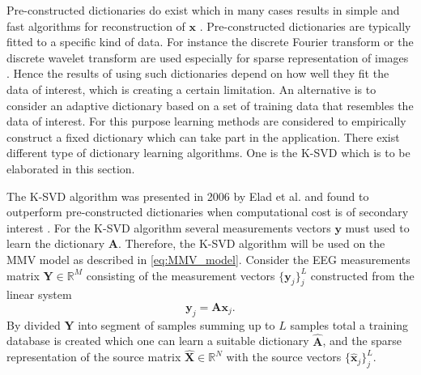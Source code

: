 Pre-constructed dictionaries do exist which in many cases results in simple and fast algorithms for reconstruction of $\mathbf{x}$ \cite{Elad_book}. 
Pre-constructed dictionaries are typically fitted to a specific kind of data. 
For instance the discrete Fourier transform or the discrete wavelet transform are used especially for sparse representation of images \cite{Elad_book}. 
Hence the results of using such dictionaries depend on how well they fit the data of interest, which is creating a certain limitation. 
An alternative is to consider an adaptive dictionary based on a set of training data that resembles the data of interest. 
For this purpose learning methods are considered to empirically construct a fixed dictionary which can take part in the application. 
There exist different type of dictionary learning algorithms. One is the K-SVD which is to be elaborated in this section. 

The K-SVD algorithm was presented in 2006 by Elad et al. and found to outperform pre-constructed dictionaries when computational cost is of secondary interest \cite{Elad2006}. 
For the K-SVD algorithm several measurements vectors $\mathbf{y}$ must used to learn the dictionary $\mathbf{A}$. Therefore, the K-SVD algorithm will be used on the MMV model as described in \eqref{eq:MMV_model}.
Consider the EEG measurements matrix $\mathbf{Y} \in \mathbb{R}^M$ consisting of the measurement vectors $\lbrace \mathbf{y}_j \rbrace_j^L$ constructed from the linear system
$$
\mathbf{y}_j = \mathbf{A} \mathbf{x}_j.
$$ 
By divided $\mathbf{Y}$ into segment of samples summing up to $L$ samples total a training database is created which one can learn a suitable dictionary $\hat{\mathbf{A}}$, and the sparse representation of the source matrix $\hat{\mathbf{X}} \in \mathbb{R}^N$ with the source vectors $\lbrace \hat{\mathbf{x}}_j \rbrace_j^L$.

